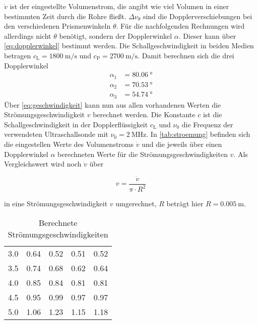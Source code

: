 $\dot{v}$ ist der eingestellte Volumenstrom, die angibt wie viel Volumen in einer bestimmten Zeit durch die Rohre fließt. 
$\Delta \nu _\theta$ sind die Dopplerverschiebungen bei den verschiedenen Prismenwinkeln $\theta$.
Für die nachfolgenden Rechnungen wird allerdings nicht $\theta$ benötigt, sondern der Dopplerwinkel $\alpha$. 
Dieser kann über \autoref{eq:dopplerwinkel} bestimmt werden.
Die Schallgeschwindigkeit in beiden Medien betragen $c_\text{L} = \SI{1800}{\meter\per\second}$ und $c_\text{P} = \SI{2700}{\meter\per\second}$.
Damit berechnen sich die drei Dopplerwinkel
\begin{align}
\alpha_1 &= \SI{80.06}{\degree}\\
\alpha_2 &= \SI{70.53}{\degree}\\
\alpha_3 &= \SI{54.74}{\degree}
\end{align}
Über \autoref{eq:geschwindigkeit} kann nun aus allen vorhandenen Werten die Strömungsgeschwindigkeit $v$ berechnet werden.
Die Konstante $c$ ist die Schallgeschwindigkeit in der Dopplerflüssigkeit $c_\text{L}$ und $\nu _0$ die Frequenz der verwendeten Ultraschallsonde mit $\nu _0 = \SI{2}{\mega\hertz}$.
In \autoref{tab:stroemung} befinden sich die eingestellen Werte des Volumenstroms $\dot{v}$ und die jeweils über einen Dopplerwinkel $\alpha$ berechneten Werte für die Strömungsgeschwindigkeiten $v$.
Als Vergleichswert wird noch $\dot{v}$ über 

\begin{equation}
v = \frac{\dot{v}}{\pi \cdot R^2}
\end{equation}

in eine Strömungsgeschwindigkeit $v$ umgerechnet, $R$ beträgt hier $R = \SI{0.005}{\meter}$.

\begin{table}
    \centering
    \caption{Berechnete Strömungsgeschwindigkeiten}
    \begin{tabular}{S[table-format=1.1] S[table-format=1.2] S[table-format=1.2] S[table-format=1.2] S[table-format=1.2]}
        \toprule
         &  &  & & \\
         & 0.64 & 0.52 & 0.51 & 0.52 \\
        3.5 & 0.74 & 0.68 & 0.62 & 0.64 \\
        4.0 & 0.85 & 0.84 & 0.81 & 0.81 \\
        4.5 & 0.95 & 0.99 & 0.97 & 0.97 \\
        5.0 & 1.06 & 1.23 & 1.15 & 1.18 \\
        \bottomrule
    \end{tabular}
    \label{tab:stroemung}
\end{table}

